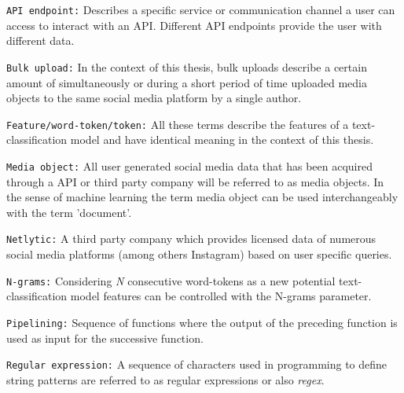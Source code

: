 \texttt{API endpoint:} Describes a specific service or communication channel a user can access to interact with an API. Different API endpoints provide the user with different data.
\newline

\texttt{Bulk upload:} In the context of this thesis, bulk uploads describe a certain amount of simultaneously or during a short period of time uploaded media objects to the same social media platform by a single author.
\newline

\texttt{Feature/word-token/token:} All these terms describe the features of a text-classification model and have identical meaning in the context of this thesis.
\newline

\texttt{Media object:} All user generated social media data that has been acquired through a API or third party company will be referred to as media objects. In the sense of machine learning the term media object can be used interchangeably with the term 'document'.
\newline

\texttt{Netlytic:} A third party company which provides licensed data of numerous social media platforms (among others Instagram) based on user specific queries.
\newline

\texttt{N-grams:} Considering \textit{N} consecutive word-tokens as a new potential text-classification model features can be controlled with the N-grams parameter.

\texttt{Pipelining:} Sequence of functions where the output of the preceding function is used as input for the successive function.

\texttt{Regular expression:} A sequence of characters used in programming to define string patterns are referred to as regular expressions or also \textit{regex}.

\cleardoublepage

